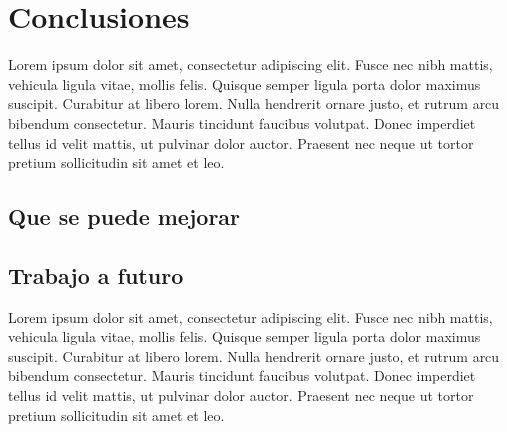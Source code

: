 \chapter{Conclusiones}\label{ch:chapter5}

Lorem ipsum dolor sit amet, consectetur adipiscing elit. Fusce nec nibh mattis, vehicula ligula vitae, mollis felis. Quisque semper ligula porta dolor maximus suscipit. Curabitur at libero lorem. Nulla hendrerit ornare justo, et rutrum arcu bibendum consectetur. Mauris tincidunt faucibus volutpat. Donec imperdiet tellus id velit mattis, ut pulvinar dolor auctor. Praesent nec neque ut tortor pretium sollicitudin sit amet et leo.

\section{Que se puede mejorar}

\section{Trabajo a futuro}

Lorem ipsum dolor sit amet, consectetur adipiscing elit. Fusce nec nibh mattis, vehicula ligula vitae, mollis felis. Quisque semper ligula porta dolor maximus suscipit. Curabitur at libero lorem. Nulla hendrerit ornare justo, et rutrum arcu bibendum consectetur. Mauris tincidunt faucibus volutpat. Donec imperdiet tellus id velit mattis, ut pulvinar dolor auctor. Praesent nec neque ut tortor pretium sollicitudin sit amet et leo.

